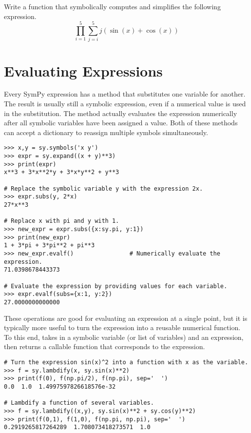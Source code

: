 \begin{problem}
Write a function that symbolically computes and simplifies the following expression.
\[\prod_{i=1}^{5} \sum_{j=i}^{5}j(\sin(x)+\cos(x))\]
\end{problem}

\section*{Evaluating Expressions} %

Every SymPy expression has a  method that substitutes one variable for another.
The result is usually still a symbolic expression, even if a numerical value is used in the substitution.
The  method actually evaluates the expression numerically after all symbolic variables have been assigned a value.
Both of these methods can accept a dictionary to reassign multiple symbols simultaneously.

\begin{lstlisting}
>>> x,y = sy.symbols('x y')
>>> expr = sy.expand((x + y)**3)
>>> print(expr)
x**3 + 3*x**2*y + 3*x*y**2 + y**3

# Replace the symbolic variable y with the expression 2x.
>>> expr.subs(y, 2*x)
27*x**3

# Replace x with pi and y with 1.
>>> new_expr = expr.subs({x:sy.pi, y:1})
>>> print(new_expr)
1 + 3*pi + 3*pi**2 + pi**3
>>> new_expr.evalf()                # Numerically evaluate the expression.
71.0398678443373

# Evaluate the expression by providing values for each variable.
>>> expr.evalf(subs={x:1, y:2})
27.0000000000000
\end{lstlisting}

These operations are good for evaluating an expression at a single point, but it is typically more useful to turn the expression into a reusable numerical function.
To this end,  takes in a symbolic variable (or list of variables) and an expression, then returns a callable function that corresponds to the expression.

\begin{lstlisting}
# Turn the expression sin(x)^2 into a function with x as the variable.
>>> f = sy.lambdify(x, sy.sin(x)**2)
>>> print(f(0), f(np.pi/2), f(np.pi), sep='  ')
0.0  1.0  1.4997597826618576e-32

# Lambdify a function of several variables.
>>> f = sy.lambdify((x,y), sy.sin(x)**2 + sy.cos(y)**2)
>>> print(f(0,1), f(1,0), f(np.pi, np.pi), sep='  ')
0.2919265817264289  1.708073418273571  1.0
\end{lstlisting}

